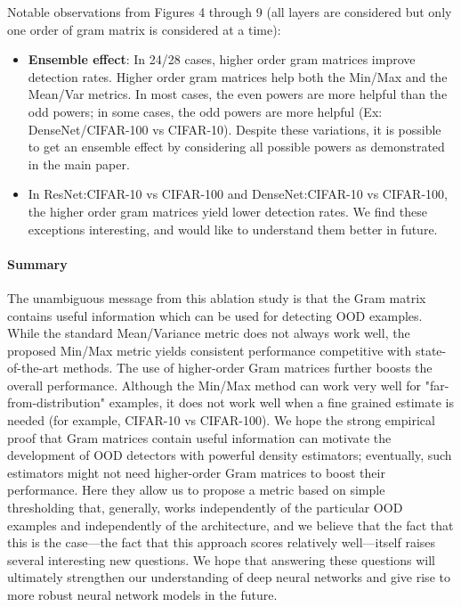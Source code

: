 \documentclass{article}
\begin{document}
Notable observations from Figures 4 through 9 (all layers are considered but only one order of gram matrix is considered at a time):
\begin{itemize}
    \item \textbf{Ensemble effect}: In 24/28 cases, higher order gram matrices improve detection rates. Higher order gram matrices help both the Min/Max and the Mean/Var metrics. In most cases, the even powers are more helpful than the odd powers; in some cases, the odd powers are more helpful (Ex: DenseNet/CIFAR-100 vs CIFAR-10). Despite these variations, it is possible to get an ensemble effect by considering all possible powers as demonstrated in the main paper.
    \item In ResNet:CIFAR-10 vs CIFAR-100 and DenseNet:CIFAR-10 vs CIFAR-100, the higher order gram matrices yield lower detection rates. We find these exceptions interesting, and would like to understand them better in future.
\end{itemize}

\paragraph{Summary} The unambiguous message from this ablation study is that the Gram matrix contains useful information which can be used for detecting OOD examples. While the standard Mean/Variance metric does not always work well, the proposed Min/Max metric yields consistent performance competitive with state-of-the-art methods. The use of higher-order Gram matrices further boosts the overall performance. Although the Min/Max method can work very well for "far-from-distribution" examples, it does not work well when a fine grained estimate is needed (for example, CIFAR-10 vs CIFAR-100). We hope the strong empirical proof that Gram matrices contain useful information can motivate the development of OOD detectors with powerful density estimators; eventually, such estimators might not need higher-order Gram matrices to boost their performance. Here they allow us to propose a metric based on simple thresholding that, generally, works independently of the particular OOD examples and independently of the architecture, and we believe that the fact that this is the case---the fact that this approach scores relatively well---itself raises several interesting new questions. We hope that answering these questions will ultimately strengthen our understanding of deep neural networks and give rise to more robust neural network models in the future.
\end{document}
